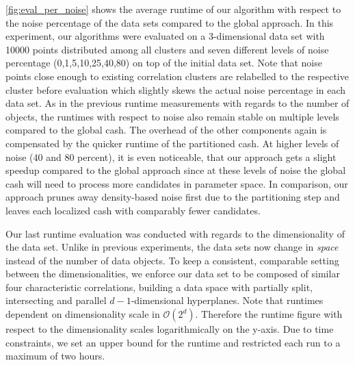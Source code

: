 \autoref{fig:eval_per_noise} shows the average runtime of our algorithm with respect to the noise percentage of the data sets compared to the global approach. In this experiment, our algorithms were evaluated on a 3-dimensional data set with 10000 points distributed among all clusters and seven different levels of noise percentage (0,1,5,10,25,40,80) on top of the initial data set. Note that noise points close enough to existing correlation clusters are relabelled to the respective cluster before evaluation which slightly skews the actual noise percentage in each data set.
As in the previous runtime measurements with regards to the number of objects, the runtimes with respect to noise also remain stable on multiple levels compared to the global \gls{cash}. The overhead of the other components again is compensated by the quicker runtime of the partitioned \gls{cash}. At higher levels of noise (40 and 80 percent), it is even noticeable, that our approach gets a slight speedup compared to the global approach since at these levels of noise the global cash will need to process more candidates in parameter space. In comparison, our approach prunes away density-based noise first due to the partitioning step and leaves each localized \gls{cash} with comparably fewer candidates.

Our last runtime evaluation was conducted with regards to the dimensionality of the data set. Unlike in previous experiments, the data sets now change in \textit{space} instead of the number of data objects. To keep a consistent, comparable setting between the dimensionalities, we enforce our data set to be composed of similar four characteristic correlations, building a data space with partially split, intersecting and parallel $d-1$-dimensional hyperplanes. 
Note that runtimes dependent on dimensionality scale in $\mathcal{O}(2^d)$. Therefore the runtime figure with respect to the dimensionality scales logarithmically on the y-axis. Due to time constraints, we set an upper bound for the runtime and restricted each run to a maximum of two hours. 

